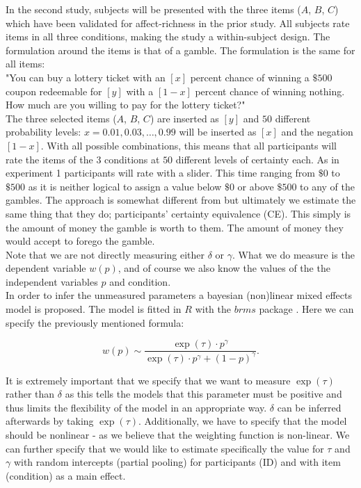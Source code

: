 \documentclass[12pt]{article}
\begin{document}
\vspace{3mm}

In the second study, subjects will be presented
with the three items ($A$,  $B$,  $C$)
which have been validated
for affect-richness in the prior study. All
subjects rate items in all three conditions,
making the study a within-subject design.
The formulation
around the items is that of a gamble.
The formulation is the same
for all items: \\

"You can buy a lottery ticket with an $[x]$
percent chance of winning a $\$500$ coupon
redeemable for $[y]$ with a $[1-x]$ percent
chance of winning nothing. How much are you
willing to pay for the lottery ticket?" \\

The three selected items
($A$,  $B$,  $C$) are inserted as $[y]$
and $50$ different probability levels:
$x = 0.01, 0.03, \ldots, 0.99$ will be
inserted as $[x]$ and the negation $[1-x]$.
With all
possible combinations, this means that
all participants will rate the items of
the $3$ conditions
at $50$ different levels of certainty each.
As in experiment 1 participants will rate
with a slider. This time ranging from
$\$0$ to $\$500$ as it is neither logical
to assign a value below $\$0$ or above
$\$500$ to any of the gambles.
The approach is somewhat
different from \textcite{gonzalez1999shape}
but ultimately we estimate the same thing that
they do; participants' certainty equivalence (CE).
This simply is the amount of money the
gamble is worth to them. The amount of money
they would accept to forego the gamble. \\

Note that we are not directly measuring either
$\delta$ or $\gamma$. What we do measure is the
dependent variable $w(p)$, and of course
we also know the values of the the independent
variables $p$ and condition. \\

In order to infer the
unmeasured parameters a bayesian (non)linear
mixed effects model is proposed. The model
is fitted in $R$ \autocite{rcore}
with the  $brms$ package \autocite{brms}.
Here we can specify the previously
mentioned formula:

 \[
	 w(p) \sim \frac{\exp({\tau})\cdot p^{\gamma}}
	 {\exp({\tau})\cdot p^{\gamma}+(1-p)^{\gamma}}
.\]

It is extremely important that we specify
that we want to measure $\exp(\tau)$ rather
than  $\delta$ as this tells the models that
this parameter must be positive and thus
limits the flexibility of the model in an
appropriate way.  $\delta$ can be inferred
afterwards by taking  $\exp(\tau)$.
Additionally, we have to specify that the model should
be nonlinear - as we believe that the weighting
function is non-linear.
We can further specify that we would like to
estimate specifically the value for $\tau$
and $\gamma$ with random intercepts (partial pooling)
for participants (ID) and with item (condition)
as a main
effect.
\end{document}
